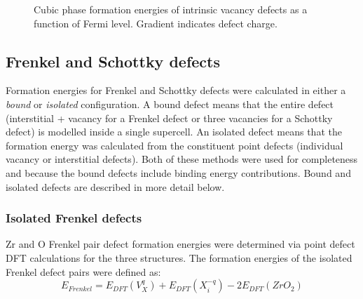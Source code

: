 \begin{figure}[ht] %
\begin{center}
		\caption{Cubic phase formation energies of intrinsic vacancy defects as a function of Fermi level. Gradient indicates defect charge.}
		\label{figure:cubicvacancies}
	\end{center}
\end{figure}

\subsection{Frenkel and Schottky defects}

Formation energies for Frenkel and Schottky defects were calculated in either a \emph{bound} or \emph{isolated} configuration. A bound defect means that the entire defect (interstitial + vacancy for a Frenkel defect or three vacancies for a Schottky defect) is modelled inside a single supercell. An isolated defect means that the formation energy was calculated from the constituent point defects (individual vacancy or interstitial defects). Both of these methods were used for completeness and because the bound defects include binding energy contributions. Bound and isolated defects are described in more detail below.

\subsubsection{Isolated Frenkel defects}

Zr and O Frenkel pair defect formation energies were determined via point defect DFT calculations for the three structures. The formation energies of the isolated Frenkel defect pairs were defined as: %
\begin{equation}
\label{equation_frenkel}
E_{Frenkel} = E_{DFT}(V^{q}_{X}) + E_{DFT}(X^{-q}_{i}) - 2E_{DFT}(ZrO_2)%
\end{equation}

